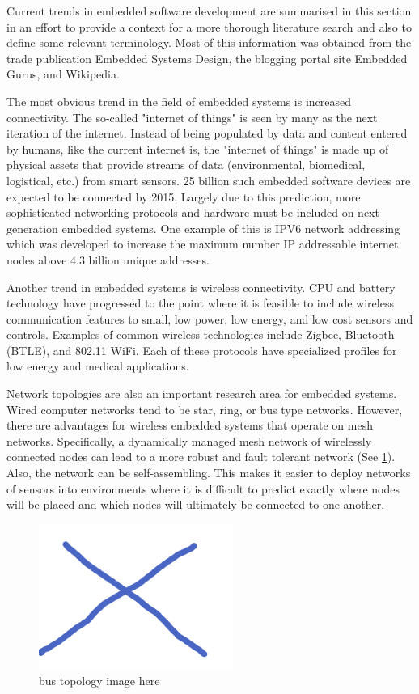 \documentclass[final,conference,10pt]{IEEEtran}
\begin{document}
Current trends in embedded software development are summarised in this section in an effort to provide a context for a more thorough literature search and also to define some relevant terminology.  Most of this information was obtained from the trade publication Embedded Systems Design, the blogging portal site Embedded Gurus, and Wikipedia.  

The most obvious trend in the field of embedded systems is increased connectivity.  The so-called "internet of things" is seen by many as the next iteration of the internet. Instead of being populated by data and content entered by humans, like the current internet is, the "internet of things" is made up of physical assets that provide streams of data (environmental, biomedical, logistical, etc.) from smart sensors.  25 billion such embedded software devices are expected to be connected by 2015. Largely due to this prediction, more sophisticated networking protocols and hardware must be included on next generation embedded systems.  One example of this is IPV6 network addressing which was developed to increase the maximum number IP addressable internet nodes above 4.3 billion unique addresses.  

Another trend in embedded systems is wireless connectivity.  CPU and battery technology have progressed to the point where it is feasible to include wireless communication features to small, low power, low energy, and low cost sensors and controls.  Examples of common wireless technologies include Zigbee, Bluetooth (BTLE), and 802.11 WiFi.  Each of these protocols have specialized profiles for low energy and medical applications.

Network topologies are also an important research area for embedded systems.  Wired computer networks tend to be star, ring, or bus type networks.  However, there are advantages for wireless embedded systems that operate on mesh networks.  Specifically, a dynamically managed mesh network of wirelessly connected nodes can lead to a more robust and fault tolerant network (See \figurename \ref{fig_sim}).  Also, the network can be self-assembling.  This makes it easier to deploy networks of sensors into environments where it is difficult to predict exactly where nodes will be placed and which nodes will ultimately be connected to one another.

\begin{figure}[!t]
\centering
\includegraphics[width=2.5in]{topology}
\caption{bus topology image here}
\label{fig_sim}
\end{figure}
\end{document}
